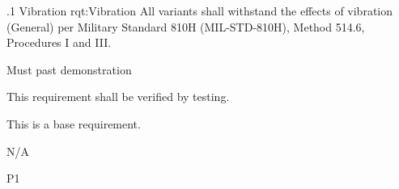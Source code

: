 \ONERQMTVKSA
{\RqtNumberBase.1}
{Vibration}
{rqt:Vibration}
{All \ThisSystem variants shall withstand the effects of vibration (General) per Military Standard 810H (MIL-STD-810H), Method 514.6, Procedures I and III.}
{
	\item [Phase 1] Must past demonstration
}
{This requirement shall be verified by testing.}
{
\item [N/A] This is a base requirement.
}
{
	\item N/A
}
{P1}
